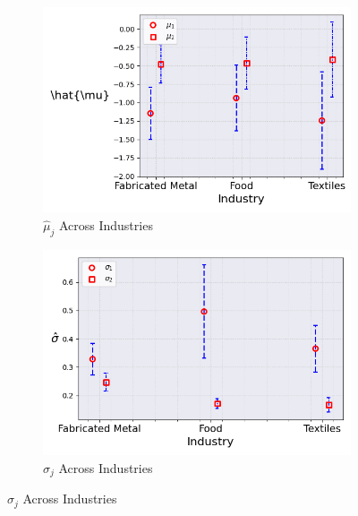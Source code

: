 \documentclass{article}
\begin{document}
\begin{figure}[ht!]
    \begin{subfigure}[t]{0.32\textwidth}
        \centering
        \includegraphics[width=\textwidth]{figure/stationary_mixture_mubar_across_industries_m2.png}
        \caption{$\hat{\mu}_j$ Across Industries}

    \end{subfigure}
    \begin{subfigure}[t]{0.32\textwidth}
        \centering
        \includegraphics[width=\textwidth]{figure/stationary_mixture_sigma_across_industries_m2.png}
        \caption{$\hat\sigma_j$ Across Industries}
    \end{subfigure}
\end{figure}
\end{document}
